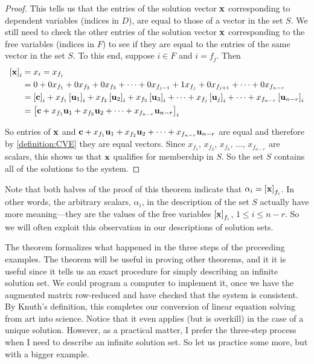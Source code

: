 \documentclass{ximera}
\begin{document}
\begin{theorem}
\begin{proof}
    This tells us that the entries of the solution vector $\mathbf{x}$
    corresponding to dependent variables (indices in $D$), are equal
    to those of a vector in the set $S$.  We still need to check the
    other entries of the solution vector $\mathbf{x}$ corresponding to
    the free variables (indices in $F$) to see if they are equal to
    the entries of the same vector in the set $S$.  To this end,
    suppose $i\in F$ and $i=f_j$.  Then
    \begin{align*}
      \left\lbrack\mathbf{x}\right\rbrack_{i}
      &=x_{i}=x_{f_j}\\
      &=
        0+
        0x_{f_1}+
        0x_{f_2}+
        0x_{f_3}+
        \cdots+
        0x_{f_{j-1}}+
        1x_{f_j}+
        0x_{f_{j+1}}+
        \cdots+
        0x_{f_{n-r}}\\
      &=
        \left\lbrack\mathbf{c}\right\rbrack_{i}+
        x_{f_1}\left\lbrack\mathbf{u}_1\right\rbrack_{i}+
        x_{f_2}\left\lbrack\mathbf{u}_2\right\rbrack_{i}+
        x_{f_3}\left\lbrack\mathbf{u}_3\right\rbrack_{i}+
        \cdots+
        x_{f_j}\left\lbrack\mathbf{u}_j\right\rbrack_{i}+
        \cdots+
        x_{f_{n-r}}\left\lbrack\mathbf{u}_{n-r}\right\rbrack_{i}\\
      &=\left\lbrack
        \mathbf{c}
        +x_{f_1}\mathbf{u}_1
        +x_{f_2}\mathbf{u}_2
        +\cdots
        +x_{f_{n-r}}\mathbf{u}_{n-r}
        \right\rbrack_{i}
    \end{align*}
    
    So entries of $\mathbf{x}$ and
    $\mathbf{c} +x_{f_1}\mathbf{u}_1 +x_{f_2}\mathbf{u}_2 +\cdots
    +x_{f_{n-r}}\mathbf{u}_{n-r}$ are equal and therefore by
    \ref{definition:CVE} they are equal vectors.  Since
    $x_{f_1},\,x_{f_2},\,x_{f_3},\,\ldots,\,x_{f_{n-r}}$ are scalars,
    this shows us that $\mathbf{x}$ qualifies for membership in $S$. So
    the set $S$ contains all of the solutions to the system.

  \end{proof}
\end{theorem}

Note that both halves of the proof of this theorem indicate that
$\alpha_i=\left\lbrack\mathbf{x}\right\rbrack_{f_i}$.  In other words, the arbitrary
scalars, $\alpha_i$, in the description of the set $S$ actually have
more meaning---they are the values of the free variables
$\left\lbrack\mathbf{x}\right\rbrack_{f_i}$, $1\leq i\leq n-r$.  So we will often
exploit this observation in our descriptions of solution sets.

The theorem formalizes what happened in the three steps of the
preceeding examples.  The theorem will be useful in proving other
theorems, and it it is useful since it tells us an exact procedure for
simply describing an infinite solution set.  We could program a
computer to implement it, once we have the augmented matrix
row-reduced and have checked that the system is consistent.  By
Knuth's definition, this completes our conversion of linear equation
solving from art into science.  Notice that it even applies (but is
overkill) in the case of a unique solution.  However, as a practical
matter, I prefer the three-step process when I need to describe an
infinite solution set.  So let us practice some more, but with a
bigger example.
\end{document}
